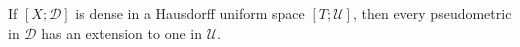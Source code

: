 If $[X; \mathcal{D}]$ is dense in a Hausdorff uniform space $[T; \mathcal{U}]$, then every pseudometric in $\mathcal{D}$ has an extension to one in $\mathcal{U}$.
